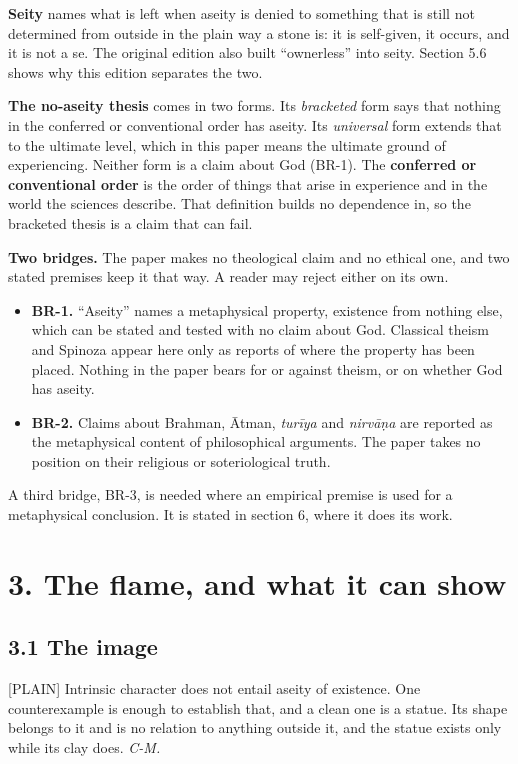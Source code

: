 \documentclass[11pt]{article}
\newcommand{\register}[1]{{\ttfamily\small #1}}
\begin{document}
\textbf{Seity} names what is left when aseity is denied to something that is still not determined from outside in the plain way a stone is: it is self-given, it occurs, and it is not a se. The original edition also built ``ownerless'' into seity. Section 5.6 shows why this edition separates the two.

\textbf{The no-aseity thesis} comes in two forms. Its \emph{bracketed} form says that nothing in the conferred or conventional order has aseity. Its \emph{universal} form extends that to the ultimate level, which in this paper means the ultimate ground of experiencing. Neither form is a claim about God (BR-1). The \textbf{conferred or conventional order} is the order of things that arise in experience and in the world the sciences describe. That definition builds no dependence in, so the bracketed thesis is a claim that can fail.

\textbf{Two bridges.} The paper makes no theological claim and no ethical one, and two stated premises keep it that way. A reader may reject either on its own.

\begin{itemize}
\item \textbf{BR-1.} ``Aseity'' names a metaphysical property, existence from nothing else, which can be stated and tested with no claim about God. Classical theism and Spinoza appear here only as reports of where the property has been placed. Nothing in the paper bears for or against theism, or on whether God has aseity.
\item \textbf{BR-2.} Claims about Brahman, Ātman, \emph{turīya} and \emph{nirvāṇa} are reported as the metaphysical content of philosophical arguments. The paper takes no position on their religious or soteriological truth.
\end{itemize}
A third bridge, BR-3, is needed where an empirical premise is used for a metaphysical conclusion. It is stated in section 6, where it does its work.

\section*{3. The flame, and what it can show}

\subsection*{3.1 The image}

\register{[PLAIN]} Intrinsic character does not entail aseity of existence. One counterexample is enough to establish that, and a clean one is a statue. Its shape belongs to it and is no relation to anything outside it, and the statue exists only while its clay does. \emph{C-M.}
\end{document}
